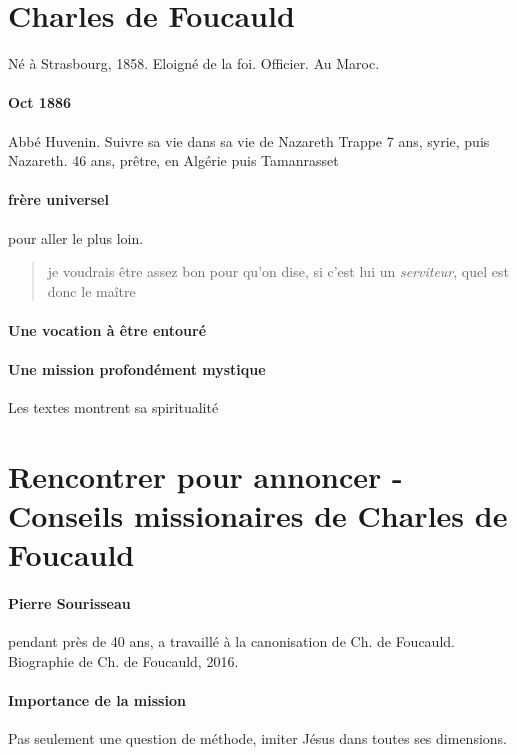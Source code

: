 \section{Charles de Foucauld}
Né à Strasbourg, 1858. 
Eloigné de la foi. Officier. Au Maroc.

\paragraph{Oct 1886} Abbé Huvenin. 
Suivre sa vie dans sa vie de Nazareth
Trappe 7 ans, syrie, puis Nazareth.
46 ans, prêtre, en Algérie puis Tamanrasset

\paragraph{frère universel} pour aller le plus loin. 
\begin{quote}
    je voudrais être assez bon pour qu'on dise, si c'est lui un \textit{serviteur}, quel est donc le maître
\end{quote}

\paragraph{Une vocation à être entouré}

\paragraph{Une mission profondément mystique} Les textes montrent sa spiritualité

\section{Rencontrer pour annoncer - Conseils missionaires de Charles de Foucauld}



\paragraph{Pierre Sourisseau} pendant près de 40 ans, a travaillé à la canonisation de Ch. de Foucauld. Biographie de Ch. de Foucauld, 2016. 

\paragraph{Importance de la mission} Pas seulement une question de méthode, imiter Jésus dans toutes ses dimensions. 

